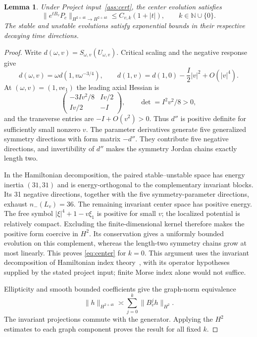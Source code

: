 \documentclass[11pt]{article}
\newtheorem{lemma}[theorem]{Lemma}
\theoremstyle{definition}
\theoremstyle{remark}
\newcommand{\N}{\mathbb N}
\newcommand{\norm}[1]{\lVert #1\rVert}
\begin{document}
\begin{lemma}\label{lem:center}
Under Project input~\ref{ass:cert}, the center evolution satisfies
\begin{equation}\label{eq:center}
 \norm{e^{tB_v}P_c}_{H^{2+4k}\to H^{2+4k}}
 \le C_{v,k}(1+|t|),\qquad k\in\N\cup\{0\}.
\end{equation}
The stable and unstable evolutions satisfy exponential bounds in their respective decaying time directions.
\end{lemma}
\begin{proof}
Write $d(\omega,v)=S_{\omega,v}(U_{\omega,v})$. Critical scaling and the negative response give
\[
 d(\omega,v)=\omega d(1,v\omega^{-3/4}),\qquad
 d(1,v)=d(1,0)-\frac I2|v|^2+O(|v|^4).
\]
At $(\omega,v)=(1,ve_1)$ the leading axial Hessian is
\[
 \begin{pmatrix}-3Iv^2/8&Iv/2\\Iv/2&-I\end{pmatrix},
 \qquad \det=I^2v^2/8>0,
\]
and the transverse entries are $-I+O(v^2)>0$. Thus $d''$ is positive definite for sufficiently small nonzero $v$. The parameter derivatives generate five generalized symmetry directions with form matrix $-d''$. They contribute five negative directions, and invertibility of $d''$ makes the symmetry Jordan chains exactly length two.

In the Hamiltonian decomposition, the paired stable--unstable space has energy inertia $(31,31)$ and is energy-orthogonal to the complementary invariant blocks. Its 31 negative directions, together with the five symmetry-parameter directions, exhaust $n_-(L_v)=36$. The remaining invariant center space has positive energy. The free symbol $|\xi|^4+1-v\xi_1$ is positive for small $v$; the localized potential is relatively compact. Excluding the finite-dimensional kernel therefore makes the positive form coercive in $H^2$. Its conservation gives a uniformly bounded evolution on this complement, whereas the length-two symmetry chains grow at most linearly. This proves \eqref{eq:center} for $k=0$. This argument uses the invariant decomposition of Hamiltonian index theory~\cite{LinZeng}, with its operator hypotheses supplied by the stated project input; finite Morse index alone would not suffice.

Ellipticity and smooth bounded coefficients give the graph-norm equivalence
\[
 \norm h_{H^{2+4k}}\asymp\sum_{j=0}^k\norm{B_v^jh}_{H^2}.
\]
The invariant projections commute with the generator. Applying the $H^2$ estimates to each graph component proves the result for all fixed $k$.
\end{proof}
\end{document}
